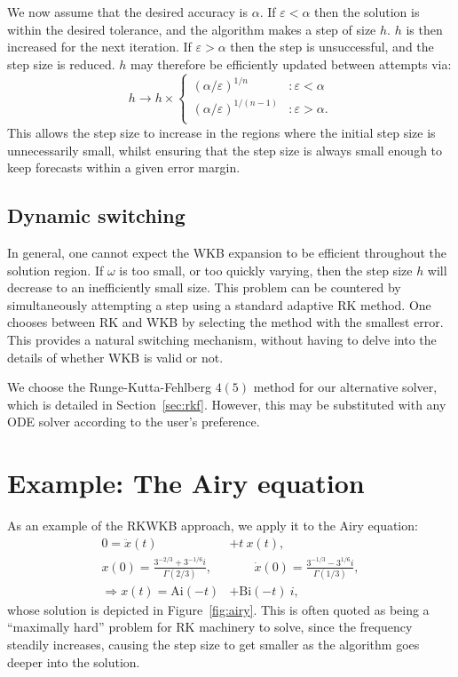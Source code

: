 We now assume that the desired accuracy is \(\alpha\). If \(\varepsilon<\alpha\) then the solution is within the desired tolerance, and the algorithm makes a step of size \(h\). \(h\) is then increased for the next iteration. If \(\varepsilon>\alpha\) then the step is unsuccessful, and the step size is reduced. \(h\) may therefore be efficiently updated between attempts via:
\begin{equation}
  h \to h\times\left\{
  \begin{array}{lr}
    {(\alpha/\varepsilon)}^{1/n} &: \varepsilon<\alpha \\
    {(\alpha/\varepsilon)}^{1/(n-1)} &: \varepsilon>\alpha. \\
  \end{array}
  \right.\label{eqn:h_update}
\end{equation}
This allows the step size to increase in the regions where the initial step size is unnecessarily small, whilst ensuring that the step size is always small enough to keep forecasts within a given error margin.

\subsection{Dynamic switching}
In general, one cannot expect the WKB expansion to be efficient throughout the solution region. If \(\omega\) is too small, or too quickly varying, then the step size \(h\) will decrease to an inefficiently small size. This problem can be countered by simultaneously attempting a step using a standard adaptive RK method. One chooses between RK and WKB by selecting the method with the smallest error. This provides a natural switching mechanism, without having to delve into the details of whether WKB is valid or not.

We choose the Runge-Kutta-Fehlberg \(4(5)\) method for our alternative solver, which is detailed in Section~\ref{sec:rkf}. However, this may be substituted with any ODE solver according to the user's preference.

\section{Example: The Airy equation}


As an example of the RKWKB approach, we apply it to the Airy equation:
\begin{align}
  0=\ddot{x}(t) &+ t\: x(t) ,
  \label{eqn:airy_equation}\\
  x(0)=\frac{3^{-2/3}+3^{-1/6}i}{\Gamma(2/3)},
  &\qquad
  \dot{x}(0) = \frac{3^{-1/3}-3^{1/6}i}{\Gamma(1/3)},
  \nonumber\\
  \Rightarrow x(t) = \mathrm{Ai}(-t) &+ \mathrm{Bi}(-t)\:i,
  \label{eqn:airy_solution}
\end{align}
whose solution is depicted in Figure~\ref{fig:airy}. This is often quoted as being a ``maximally hard'' problem for RK machinery to solve, since the frequency steadily increases, causing the step size to get smaller as the algorithm goes deeper into the solution.

